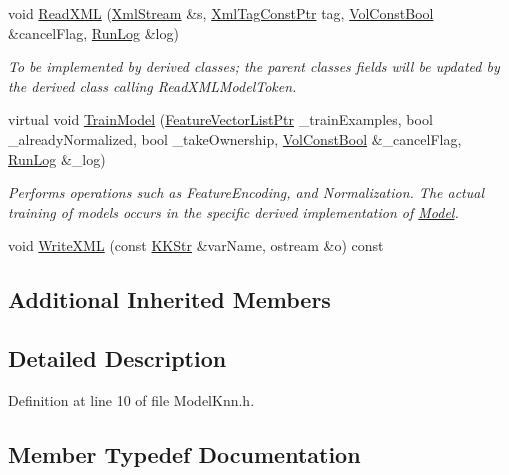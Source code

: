 \begin{DoxyCompactItemize}
void \hyperlink{class_k_k_m_l_l_1_1_model_knn_a51dcb3399032bf92901278e43c4e907c}{Read\+X\+ML} (\hyperlink{class_k_k_b_1_1_xml_stream}{Xml\+Stream} \&s, \hyperlink{namespace_k_k_b_a5f1b0b1667d79fec26deeff10c43df23}{Xml\+Tag\+Const\+Ptr} tag, \hyperlink{namespace_k_k_b_a7d390f568e2831fb76b86b56c87bf92f}{Vol\+Const\+Bool} \&cancel\+Flag, \hyperlink{class_k_k_b_1_1_run_log}{Run\+Log} \&log)
\begin{DoxyCompactList}\small\item\em To be implemented by derived classes; the parent classes fields will be updated by the derived class calling Read\+X\+M\+L\+Model\+Token. \end{DoxyCompactList}\item 
virtual void \hyperlink{class_k_k_m_l_l_1_1_model_knn_a4dac911ec83b0967ec87062beb2697d7}{Train\+Model} (\hyperlink{namespace_k_k_m_l_l_acf2ba92a3cf03e2b19674b24ff488ef6}{Feature\+Vector\+List\+Ptr} \+\_\+train\+Examples, bool \+\_\+already\+Normalized, bool \+\_\+take\+Ownership, \hyperlink{namespace_k_k_b_a7d390f568e2831fb76b86b56c87bf92f}{Vol\+Const\+Bool} \&\+\_\+cancel\+Flag, \hyperlink{class_k_k_b_1_1_run_log}{Run\+Log} \&\+\_\+log)
\begin{DoxyCompactList}\small\item\em Performs operations such as Feature\+Encoding, and Normalization. The actual training of models occurs in the specific derived implementation of \textquotesingle{}\hyperlink{class_k_k_m_l_l_1_1_model}{Model}\textquotesingle{}. \end{DoxyCompactList}\item 
void \hyperlink{class_k_k_m_l_l_1_1_model_knn_a53d42c5f481669518e7d257372a9dd52}{Write\+X\+ML} (const \hyperlink{class_k_k_b_1_1_k_k_str}{K\+K\+Str} \&var\+Name, ostream \&o) const 
\end{DoxyCompactItemize}
\subsection*{Additional Inherited Members}


\subsection{Detailed Description}


Definition at line 10 of file Model\+Knn.\+h.



\subsection{Member Typedef Documentation}
